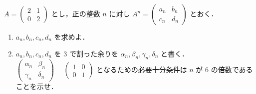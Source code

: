 \documentclass[../../main.tex]{subfiles}
\begin{document}
$A=
\begin{pmatrix} 2 & 1 \\ 0 & 2
\end{pmatrix}$ とし，正の整数 $n$ に対し $A^n =
\begin{pmatrix} a_n & b_n \\ c_n & d_n
\end{pmatrix}$ とおく．
\begin{enumerate}
  \item $a_n, b_n, c_n, d_n$ を求めよ．
  \item $a_n, b_n, c_n, d_n$ を $3$ で割った余りを $\alpha_n, \beta_n, \gamma_n, \delta_n$ と書く．
    $
    \begin{pmatrix} \alpha_n & \beta_n \\ \gamma_n & \delta_n
    \end{pmatrix} =
    \begin{pmatrix} 1 & 0 \\ 0 & 1
    \end{pmatrix}$ となるための必要十分条件は $n$ が $6$ の倍数であることを示せ．
\end{enumerate}
\end{document}
